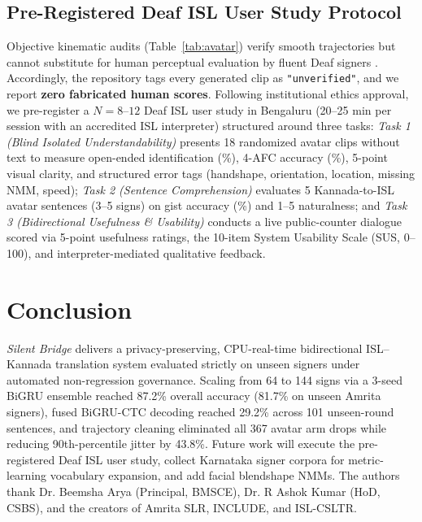 \documentclass[a4paper,12pt]{article}
\begin{document}
\subsection{Pre-Registered Deaf ISL User Study Protocol}
Objective kinematic audits (Table~\ref{tab:avatar}) verify smooth trajectories but cannot substitute for human perceptual evaluation by fluent Deaf signers \cite{wolfe2022avatars}. Accordingly, the repository tags every generated clip as \texttt{"unverified"}, and we report \textbf{zero fabricated human scores}. Following institutional ethics approval, we pre-register a $N = 8$--$12$ Deaf ISL user study in Bengaluru (20--25 min per session with an accredited ISL interpreter) structured around three tasks: \textit{Task 1 (Blind Isolated Understandability)} presents 18 randomized avatar clips without text to measure open-ended identification (\%), 4-AFC accuracy (\%), 5-point visual clarity, and structured error tags (handshape, orientation, location, missing NMM, speed); \textit{Task 2 (Sentence Comprehension)} evaluates 5 Kannada-to-ISL avatar sentences (3--5 signs) on gist accuracy (\%) and 1--5 naturalness; and \textit{Task 3 (Bidirectional Usefulness \& Usability)} conducts a live public-counter dialogue scored via 5-point usefulness ratings, the 10-item System Usability Scale (SUS, 0--100), and interpreter-mediated qualitative feedback.

\section{Conclusion}
\textit{Silent Bridge} delivers a privacy-preserving, CPU-real-time bidirectional ISL--Kannada translation system evaluated strictly on unseen signers under automated non-regression governance. Scaling from 64 to 144 signs via a 3-seed BiGRU ensemble reached 87.2\% overall accuracy (81.7\% on unseen Amrita signers), fused BiGRU-CTC decoding reached 29.2\% across 101 unseen-round sentences, and trajectory cleaning eliminated all 367 avatar arm drops while reducing 90th-percentile jitter by 43.8\%. Future work will execute the pre-registered Deaf ISL user study, collect Karnataka signer corpora for metric-learning vocabulary expansion, and add facial blendshape NMMs. The authors thank Dr. Beemsha Arya (Principal, BMSCE), Dr. R Ashok Kumar (HoD, CSBS), and the creators of Amrita SLR, INCLUDE, and ISL-CSLTR.
\end{document}
